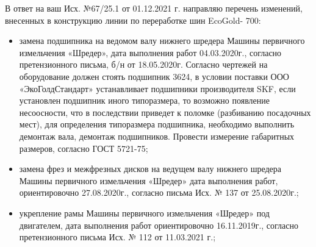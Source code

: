  В ответ на ваш Исх. №67/25.1 от 01.12.2021 г. направляю перечень изменений, внесенных в конструкцию линии по переработке шин EcoGold- 700:
\begin{itemize}
\item	
 замена подшипника на ведомом валу нижнего шредера Машины первичного измельчения «Шредер», дата выполнения работ 04.03.2020г., согласно претензионного письма, б/н от 18.05.2020г. Согласно чертежей на оборудование должен стоять подшипник 3624, в условии поставки ООО «ЭкоГолдСтандарт» устанавливает подшипники производителя SKF, если установлен подшипник иного типоразмера, то возможно появление несоосности, что в последствии приведет к поломке (разбиванию посадочных мест), для определения типоразмера подшипника, необходимо выполнить демонтаж вала, демонтаж подшипников. Провести измерение габаритных размеров, согласно ГОСТ 5721-75;

 
\item	
 замена фрез и межфрезных дисков на ведущем валу нижнего шредера Машины первичного измельчения «Шредер» дата выполнения работ, ориентировочно 27.08.2020г., согласно письма Исх. № 137 от 25.08.2020г.;
\item	
 укрепление рамы Машины первичного измельчения «Шредер» под двигателем, дата выполнения работ ориентировочно 16.11.2019г., согласно претензионного письма Исх. № 112 от 11.03.2021 г.;
 

\end{itemize}
